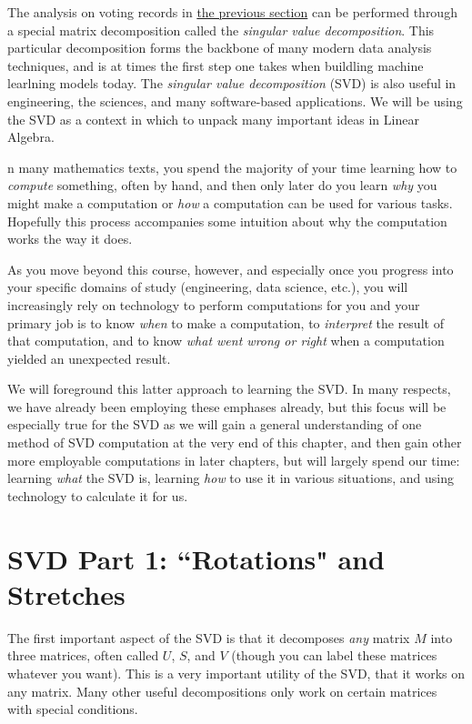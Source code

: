 \documentclass{ximera}
\begin{document}
The analysis on voting records in \href{https://ximera.osu.edu/appliedlinearalgebra/c6ChapterSix/learningActivities/m6LearningActivities/leastSquares/leastSquaresApplicationVotingImages}{the previous section} can be performed through a special matrix decomposition called the \emph{singular value decomposition}. This particular decomposition forms the backbone of many modern data analysis techniques, and is at times the first step one takes when buildling machine learlning models today. The \emph{singular value decomposition} (SVD) is also useful in engineering, the sciences, and many software-based applications. We will be using the SVD as a context in which to unpack many important ideas in Linear Algebra.

n many mathematics texts, you spend the majority of your time learning how to \emph{compute} something, often by hand, and then only later do you learn \emph{why} you might make a computation or \emph{how} a computation can be used for various tasks. Hopefully this process accompanies some intuition about why the computation works the way it does. 

As you move beyond this course, however, and especially once you progress into your specific domains of study (engineering, data science, etc.), you will increasingly rely on technology to perform computations for you and your primary job is to know \emph{when} to make a computation, to \emph{interpret} the result of that computation, and to know \emph{what went wrong or right} when a computation yielded an unexpected result. 

We will foreground this latter approach to learning the SVD. In many respects, we have already been employing these emphases already, but this focus will be especially true for the SVD as we will gain a general understanding of one method of SVD computation at the very end of this chapter, and then gain other more employable computations in later chapters, but will largely spend our time: learning \emph{what} the SVD is, learning \emph{how} to use it in various situations, and using technology to calculate it for us.

\section{SVD Part 1: ``Rotations" and Stretches}

The first important aspect of the SVD is that it decomposes \emph{any} matrix $M$ into three matrices, often called $U$, $S$, and $V$ (though you can label these matrices whatever you want). This is a very important utility of the SVD, that it works on any matrix. Many other useful decompositions only work on certain matrices with special conditions.
\end{document}

